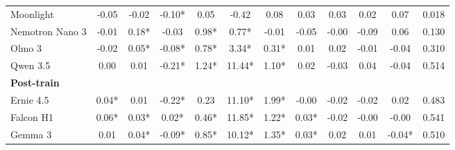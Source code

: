 \begin{table}[p]
\begin{tabular}{lccccccccccr}
Moonlight & \cellcolor[HTML]{FADCD9}-0.05 & \cellcolor[HTML]{FDF3F2}-0.02 & \cellcolor[HTML]{F5B6B0}-0.10* & \cellcolor[HTML]{FAFDFB}0.05 & \cellcolor[HTML]{FEFAF9}-0.42 & \cellcolor[HTML]{F8FDFA}0.08 & \cellcolor[HTML]{D5F2E3}0.03 & \cellcolor[HTML]{DFF5EA}0.03 & \cellcolor[HTML]{EEFAF3}0.02 & \cellcolor[HTML]{72D3A0}0.07 & 0.018 \\
Nemotron Nano 3 & \cellcolor[HTML]{FEF9F9}-0.01 & \cellcolor[HTML]{83D9AC}0.18* & \cellcolor[HTML]{FCE7E5}-0.03 & \cellcolor[HTML]{93DDB7}0.98* & \cellcolor[HTML]{F4FBF7}0.77* & \cellcolor[HTML]{FFFEFE}-0.01 & \cellcolor[HTML]{F5B4AD}-0.05 & \cellcolor[HTML]{FFFBFB}-0.00 & \cellcolor[HTML]{F6BBB5}-0.09 & \cellcolor[HTML]{8FDCB4}0.06 & 0.130 \\
Olmo 3 & \cellcolor[HTML]{FDF3F2}-0.02 & \cellcolor[HTML]{DDF4E8}0.05* & \cellcolor[HTML]{F7C2BD}-0.08* & \cellcolor[HTML]{A9E4C5}0.78* & \cellcolor[HTML]{CEF0DE}3.34* & \cellcolor[HTML]{E3F6EC}0.31* & \cellcolor[HTML]{EBF9F2}0.01 & \cellcolor[HTML]{EAF8F1}0.02 & \cellcolor[HTML]{FDF3F2}-0.01 & \cellcolor[HTML]{F6BFB9}-0.04 & 0.310 \\
Qwen 3.5 & \cellcolor[HTML]{FCFEFD}0.00 & \cellcolor[HTML]{FAFDFC}0.01 & \cellcolor[HTML]{EA6456}-0.21* & \cellcolor[HTML]{75D4A3}1.24* & \cellcolor[HTML]{57CB8E}11.44* & \cellcolor[HTML]{9DE1BD}1.10* & \cellcolor[HTML]{E1F6EB}0.02 & \cellcolor[HTML]{FBE4E1}-0.03 & \cellcolor[HTML]{D6F2E4}0.04 & \cellcolor[HTML]{F6BEB8}-0.04 & 0.514 \\
\midrule
\multicolumn{12}{l}{\textbf{Post-train}} \\
Ernie 4.5 & \cellcolor[HTML]{E0F5EA}0.04* & \cellcolor[HTML]{F6FCF9}0.01 & \cellcolor[HTML]{E9594B}-0.22* & \cellcolor[HTML]{E6F7EE}0.23 & \cellcolor[HTML]{5CCC92}11.10* & \cellcolor[HTML]{4EC889}1.99* & \cellcolor[HTML]{FFFEFE}-0.00 & \cellcolor[HTML]{FDF2F1}-0.02 & \cellcolor[HTML]{FCECEB}-0.02 & \cellcolor[HTML]{D9F3E6}0.02 & 0.483 \\
Falcon H1 & \cellcolor[HTML]{D0F0DF}0.06* & \cellcolor[HTML]{ECF9F2}0.03* & \cellcolor[HTML]{EDFAF3}0.02* & \cellcolor[HTML]{CDEFDD}0.46* & \cellcolor[HTML]{50C98A}11.85* & \cellcolor[HTML]{93DDB7}1.22* & \cellcolor[HTML]{CFF0DF}0.03* & \cellcolor[HTML]{FDEFED}-0.02 & \cellcolor[HTML]{FFFEFE}-0.00 & \cellcolor[HTML]{FEF7F6}-0.00 & 0.541 \\
Gemma 3 & \cellcolor[HTML]{FAFEFC}0.01 & \cellcolor[HTML]{E0F5EA}0.04* & \cellcolor[HTML]{F6BEB8}-0.09* & \cellcolor[HTML]{A1E2C0}0.85* & \cellcolor[HTML]{6AD19B}10.12* & \cellcolor[HTML]{88DAAF}1.35* & \cellcolor[HTML]{D0F0DF}0.03* & \cellcolor[HTML]{EFFAF4}0.02 & \cellcolor[HTML]{F3FBF7}0.01 & \cellcolor[HTML]{F6BDB7}-0.04* & 0.510 \\

\end{tabular}
\end{table}
